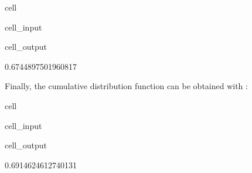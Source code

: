 \documentclass[letterpaper,10pt,english]{jupyterBook}
\begin{document}
\begin{sphinxuseclass}{cell}\begin{sphinxVerbatimInput}

\begin{sphinxuseclass}{cell_input}
\begin{sphinxVerbatim}[commandchars=\\\{\}]
  
\end{sphinxVerbatim}

\end{sphinxuseclass}\end{sphinxVerbatimInput}
\begin{sphinxVerbatimOutput}

\begin{sphinxuseclass}{cell_output}
\begin{sphinxVerbatim}[commandchars=\\\{\}]
0.6744897501960817
\end{sphinxVerbatim}

\end{sphinxuseclass}\end{sphinxVerbatimOutput}

\end{sphinxuseclass}
\sphinxAtStartPar
Finally, the cumulative distribution function can be obtained with :

\begin{sphinxuseclass}{cell}\begin{sphinxVerbatimInput}

\begin{sphinxuseclass}{cell_input}
\begin{sphinxVerbatim}[commandchars=\\\{\}]
  
\end{sphinxVerbatim}

\end{sphinxuseclass}\end{sphinxVerbatimInput}
\begin{sphinxVerbatimOutput}

\begin{sphinxuseclass}{cell_output}
\begin{sphinxVerbatim}[commandchars=\\\{\}]
0.6914624612740131
\end{sphinxVerbatim}

\end{sphinxuseclass}\end{sphinxVerbatimOutput}

\end{sphinxuseclass}
\end{document}
